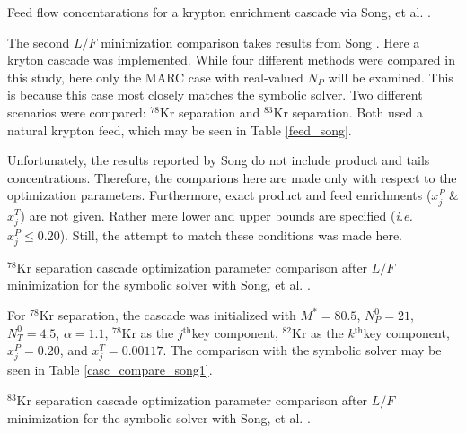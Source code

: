 \documentclass[preprint,12pt]{elsarticle}
\newcommand{\superscript}[1]{\ensuremath{^{\textrm{#1}}}}
\newcommand{\nuc}[2]{\superscript{#2}{#1}}
\newcommand{\jth}[0]{$j$\superscript{th}}
\newcommand{\kth}[0]{$k$\superscript{th}}
\begin{document}
\begin{table}[htbp]
\begin{center}
\caption{Feed flow concentarations for a krypton enrichment cascade via  
    Song, et al. \cite{doi:10.1080/01496391003793884}.}

\end{center}
\label{feed_song}
\end{table}

The second $L/F$ minimization comparison takes results from Song 
\cite{doi:10.1080/01496391003793884}.  Here a kryton
cascade was implemented.  While four different methods were compared in this study, 
here only the MARC case with real-valued $N_P$  will be examined.  This is because
this case most closely matches the symbolic solver.  Two different scenarios were
compared: \nuc{Kr}{78} separation and \nuc{Kr}{83} separation.  Both used a 
natural krypton feed, which may be seen in Table \ref{feed_song}.

Unfortunately, the results reported by Song do not include product and tails 
concentrations.  Therefore, the comparions here are made only with respect to 
the optimization parameters.  Furthermore, exact product and feed enrichments
($x_j^P$ \& $x_j^T$) are not given. Rather mere lower and upper bounds are specified
(\emph{i.e.} $x_j^P\le0.20$).
Still, the attempt to match these conditions was made here.

\begin{table}[htbp]
\begin{center}
\caption{\nuc{Kr}{78} separation cascade optimization parameter comparison after 
    $L/F$ minimization for the symbolic 
    solver with Song, et al. \cite{doi:10.1080/01496391003793884}.}

\end{center}
\label{casc_compare_song1}
\end{table}

For \nuc{Kr}{78} separation, the cascade was initialized with $M^*=80.5$, 
$N_P^0=21$, $N_T^0=4.5$, $\alpha=1.1$, \nuc{Kr}{78} as the \jth key
component, \nuc{Kr}{82} as the \kth key component, $x_j^P=0.20$, and
$x_j^T=0.00117$.  The comparison with the symbolic solver may be seen in Table
\ref{casc_compare_song1}.

\begin{table}[htbp]
\begin{center}
\caption{\nuc{Kr}{83} separation cascade optimization parameter comparison after 
    $L/F$ minimization for the symbolic 
    solver with Song, et al. \cite{doi:10.1080/01496391003793884}.}

\end{center}
\label{casc_compare_song2}
\end{table}
\end{document}
